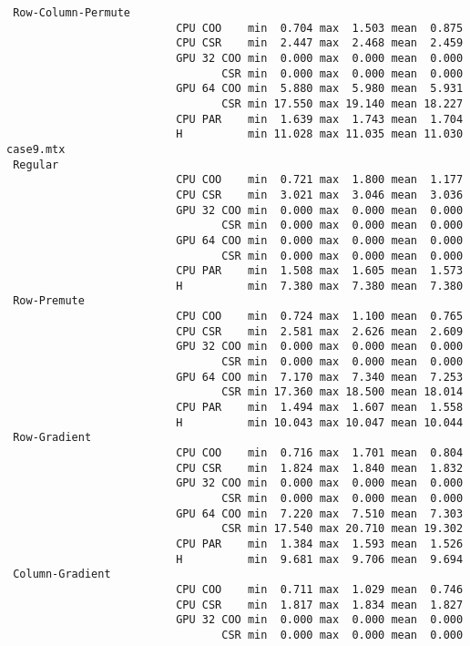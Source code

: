 \begin{verbatim}
 Row-Column-Permute
                          CPU COO    min  0.704 max  1.503 mean  0.875
                          CPU CSR    min  2.447 max  2.468 mean  2.459
                          GPU 32 COO min  0.000 max  0.000 mean  0.000
                                 CSR min  0.000 max  0.000 mean  0.000
                          GPU 64 COO min  5.880 max  5.980 mean  5.931
                                 CSR min 17.550 max 19.140 mean 18.227
                          CPU PAR    min  1.639 max  1.743 mean  1.704
                          H          min 11.028 max 11.035 mean 11.030
case9.mtx
 Regular
                          CPU COO    min  0.721 max  1.800 mean  1.177
                          CPU CSR    min  3.021 max  3.046 mean  3.036
                          GPU 32 COO min  0.000 max  0.000 mean  0.000
                                 CSR min  0.000 max  0.000 mean  0.000
                          GPU 64 COO min  0.000 max  0.000 mean  0.000
                                 CSR min  0.000 max  0.000 mean  0.000
                          CPU PAR    min  1.508 max  1.605 mean  1.573
                          H          min  7.380 max  7.380 mean  7.380
 Row-Premute
                          CPU COO    min  0.724 max  1.100 mean  0.765
                          CPU CSR    min  2.581 max  2.626 mean  2.609
                          GPU 32 COO min  0.000 max  0.000 mean  0.000
                                 CSR min  0.000 max  0.000 mean  0.000
                          GPU 64 COO min  7.170 max  7.340 mean  7.253
                                 CSR min 17.360 max 18.500 mean 18.014
                          CPU PAR    min  1.494 max  1.607 mean  1.558
                          H          min 10.043 max 10.047 mean 10.044
 Row-Gradient
                          CPU COO    min  0.716 max  1.701 mean  0.804
                          CPU CSR    min  1.824 max  1.840 mean  1.832
                          GPU 32 COO min  0.000 max  0.000 mean  0.000
                                 CSR min  0.000 max  0.000 mean  0.000
                          GPU 64 COO min  7.220 max  7.510 mean  7.303
                                 CSR min 17.540 max 20.710 mean 19.302
                          CPU PAR    min  1.384 max  1.593 mean  1.526
                          H          min  9.681 max  9.706 mean  9.694
 Column-Gradient
                          CPU COO    min  0.711 max  1.029 mean  0.746
                          CPU CSR    min  1.817 max  1.834 mean  1.827
                          GPU 32 COO min  0.000 max  0.000 mean  0.000
                                 CSR min  0.000 max  0.000 mean  0.000

\end{verbatim}

